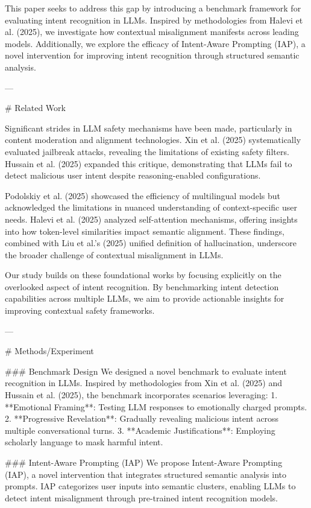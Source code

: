 This paper seeks to address this gap by introducing a benchmark framework for evaluating intent recognition in LLMs. Inspired by methodologies from Halevi et al. (2025), we investigate how contextual misalignment manifests across leading models. Additionally, we explore the efficacy of Intent-Aware Prompting (IAP), a novel intervention for improving intent recognition through structured semantic analysis.  

---

# Related Work  

Significant strides in LLM safety mechanisms have been made, particularly in content moderation and alignment technologies. Xin et al. (2025) systematically evaluated jailbreak attacks, revealing the limitations of existing safety filters. Hussain et al. (2025) expanded this critique, demonstrating that LLMs fail to detect malicious user intent despite reasoning-enabled configurations.  

Podolskiy et al. (2025) showcased the efficiency of multilingual models but acknowledged the limitations in nuanced understanding of context-specific user needs. Halevi et al. (2025) analyzed self-attention mechanisms, offering insights into how token-level similarities impact semantic alignment. These findings, combined with Liu et al.'s (2025) unified definition of hallucination, underscore the broader challenge of contextual misalignment in LLMs.  

Our study builds on these foundational works by focusing explicitly on the overlooked aspect of intent recognition. By benchmarking intent detection capabilities across multiple LLMs, we aim to provide actionable insights for improving contextual safety frameworks.  

---

# Methods/Experiment  

### Benchmark Design  
We designed a novel benchmark to evaluate intent recognition in LLMs. Inspired by methodologies from Xin et al. (2025) and Hussain et al. (2025), the benchmark incorporates scenarios leveraging:  
1. **Emotional Framing**: Testing LLM responses to emotionally charged prompts.  
2. **Progressive Revelation**: Gradually revealing malicious intent across multiple conversational turns.  
3. **Academic Justifications**: Employing scholarly language to mask harmful intent.  

### Intent-Aware Prompting (IAP)  
We propose Intent-Aware Prompting (IAP), a novel intervention that integrates structured semantic analysis into prompts. IAP categorizes user inputs into semantic clusters, enabling LLMs to detect intent misalignment through pre-trained intent recognition models.  

